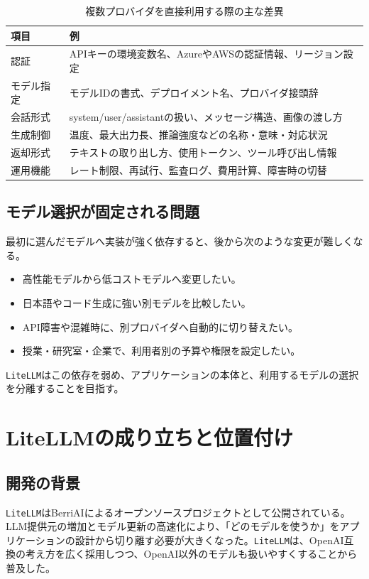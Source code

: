 \documentclass[11pt,a4paper]{bxjsarticle}
\newcommand{\litellm}{\texttt{LiteLLM}}
\begin{document}
\begin{table}[H]
\centering
\caption{複数プロバイダを直接利用する際の主な差異}
\begin{tabular}{p{35mm}p{100mm}}
\toprule
項目 & 例 \\
\midrule
認証 & APIキーの環境変数名、AzureやAWSの認証情報、リージョン設定 \\
モデル指定 & モデルIDの書式、デプロイメント名、プロバイダ接頭辞 \\
会話形式 & system/user/assistantの扱い、メッセージ構造、画像の渡し方 \\
生成制御 & 温度、最大出力長、推論強度などの名称・意味・対応状況 \\
返却形式 & テキストの取り出し方、使用トークン、ツール呼び出し情報 \\
運用機能 & レート制限、再試行、監査ログ、費用計算、障害時の切替 \\
\bottomrule
\end{tabular}
\end{table}

\subsection{モデル選択が固定される問題}
最初に選んだモデルへ実装が強く依存すると、後から次のような変更が難しくなる。
\begin{itemize}
  \item 高性能モデルから低コストモデルへ変更したい。
  \item 日本語やコード生成に強い別モデルを比較したい。
  \item API障害や混雑時に、別プロバイダへ自動的に切り替えたい。
  \item 授業・研究室・企業で、利用者別の予算や権限を設定したい。
\end{itemize}
\litellm{}はこの依存を弱め、アプリケーションの本体と、利用するモデルの選択を分離することを目指す。

\section{LiteLLMの成り立ちと位置付け}
\subsection{開発の背景}
\litellm{}はBerriAIによるオープンソースプロジェクトとして公開されている。LLM提供元の増加とモデル更新の高速化により、「どのモデルを使うか」をアプリケーションの設計から切り離す必要が大きくなった。\litellm{}は、OpenAI互換の考え方を広く採用しつつ、OpenAI以外のモデルも扱いやすくすることから普及した。
\end{document}
